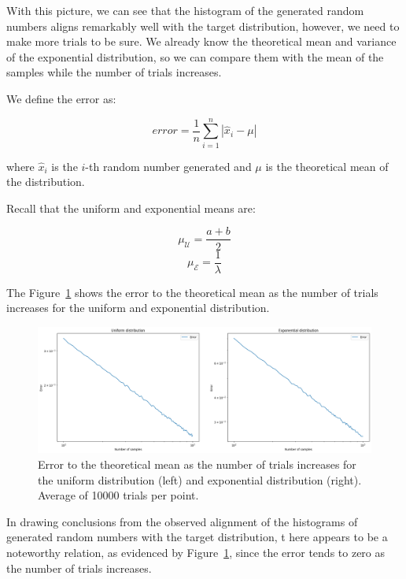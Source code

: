 \documentclass{report}
\begin{document}
With this picture, we can see that the histogram of the generated random numbers aligns remarkably well with the target distribution, however, we need to make more trials to be sure. We already know the theoretical mean and variance of the exponential distribution, so we can compare them with the mean of the samples while the number of trials increases.

We define the error as:

\begin{equation*} error = \frac{1}{n}\sum_{i=1}^{n} | \hat{x}_i - \mu | \end{equation*}

where \(\hat{x}_i\) is the \(i\)-th random number generated and \(\mu\) is the theoretical mean of the distribution.

Recall that the uniform and exponential means are:

\begin{equation*} \mu_{\mathcal{U}} = \frac{a + b}{2} \end{equation*}
\begin{equation*} \mu_{\mathcal{E}} = \frac{1}{\lambda} \end{equation*}

The Figure~\ref{fig:errors} shows the error to the theoretical mean as the number of trials increases for the uniform and exponential distribution.



\begin{figure}[H]
	\centering
	\includegraphics[width=0.8\linewidth]{./Figures/InverseCDF/errors.png}
	\caption{Error to the theoretical mean as the number of trials increases for the uniform distribution (left) and exponential distribution (right). Average of 10000 trials per point.}
	\label{fig:errors}
\end{figure}

In drawing conclusions from the observed alignment of the histograms of generated random numbers with the target distribution, t  here appears to be a noteworthy relation, as evidenced by Figure~\ref{fig:errors}, since the error tends to zero as the number of trials increases.
\end{document}

